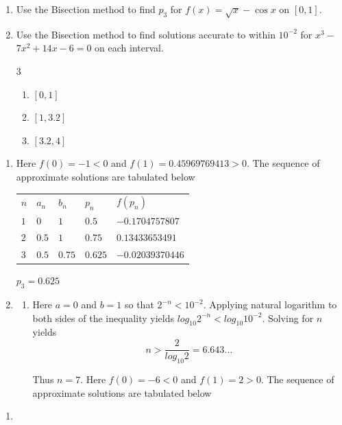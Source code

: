 \begin{myexercise}\label{Comprehensionquiz2}
\begin{enumerate}[label=\arabic*.]
\item Use the Bisection method to find $p_{3}$ for $f(x)=\sqrt{x}-\cos x$ on $[0,1]$. 
\item Use the Bisection method to find solutions accurate to within $10^{-2}$ for $x^{3}-$ $7 x^{2}+14 x-6=0$ on each interval.
\begin{multicols}{3}
\begin{enumerate}[label=(\alph*)]
\item $[0,1]$
\item $[1,3.2]$
\item $[3.2,4]$
\end{enumerate}
\end{multicols}
\end{enumerate}

\begin{mysolution}
\begin{enumerate}[label=\arabic*.]
\item Here $f(0)=-1<0$ and $f(1)=0.45969769413>0$. The sequence of approximate solutions are tabulated below

\begin{center}
\begin{tabular}{lllll}\hline
$n$&$a_n$&$b_n$&$p_n$&$f(p_n)$\\
$1$&$0$&$1$&$0.5$&$-0.1704757807$\\
$2$&$0.5$&$1$&$0.75$&$0.13433653491$\\
$3$&$0.5$&$0.75$&$0.625$&$-0.02039370446$\\\hline
\end{tabular}
\end{center}
$p_3=0.625$

\item 
\begin{enumerate}[label=(\alph*)]
\item Here $a=0$ and $b=1$ so that $2^{-n}<10^{-2}$. Applying natural logarithm to both sides of the inequality yields $log_{10}2^{-n}<log_{10}10^{-2}$. Solving for $n$ yields 
\[n>\frac{2}{log_{10}2}=6.643\ldots\]

Thus $n=7$. Here $f(0)=-6<0$ and $f(1)=2>0$. The sequence of approximate solutions are tabulated below
\end{enumerate}
\end{enumerate}
\end{mysolution}
%
\begin{mysolution}
\begin{enumerate}
\item[]


\end{enumerate}
\end{mysolution}
\end{myexercise}

